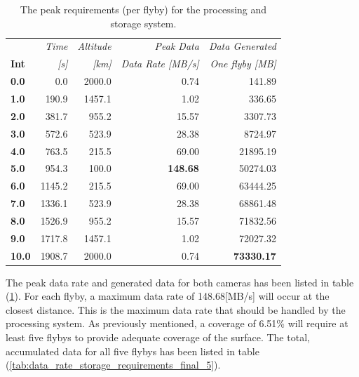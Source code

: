 \begin{table}[htb]
  \centering
    \begin{tabular}{l|r|r|r|r|}
\textbf{} & \textit{Time} & \textit{Altitude} & \textit{Peak Data} & \multicolumn{1}{r}{\textit{Data Generated}} \\
\textbf{Int} & \textit{[s]} & \textit{[km]} & \textit{Data Rate [MB/s]} & \multicolumn{1}{r}{\textit{One flyby [MB]}} \bigstrut[b]\\
\hline
\textbf{0.0} & 0.0   & 2000.0 & 0.74  & 141.89 \bigstrut[t]\\
\textbf{1.0} & 190.9 & 1457.1 & 1.02  & 336.65 \\
\textbf{2.0} & 381.7 & 955.2 & 15.57 & 3307.73 \\
\textbf{3.0} & 572.6 & 523.9 & 28.38 & 8724.97 \\
\textbf{4.0} & 763.5 & 215.5 & 69.00 & 21895.19 \\
\textbf{5.0} & 954.3 & 100.0 & \textbf{148.68} & 50274.03 \\
\textbf{6.0} & 1145.2 & 215.5 & 69.00 & 63444.25 \\
\textbf{7.0} & 1336.1 & 523.9 & 28.38 & 68861.48 \\
\textbf{8.0} & 1526.9 & 955.2 & 15.57 & 71832.56 \\
\textbf{9.0} & 1717.8 & 1457.1 & 1.02  & 72027.32 \\
\textbf{10.0} & 1908.7 & 2000.0 & 0.74  & \textbf{73330.17} \\
\end{tabular}%
        \caption{The peak requirements (per flyby) for the processing and storage system.}
  \label{tab:data_rate_storage_requirements_final}%
\end{table}%
The peak data rate and generated data for both cameras has been listed in table (\ref{tab:data_rate_storage_requirements_final}). For each flyby, a maximum data rate of 148.68[MB/s] will occur at the closest distance. This is the maximum data rate that should be handled by the processing system. 
As previously mentioned, a coverage of 6.51\% will require at least five flybys to provide adequate coverage of the surface. The total, accumulated data for all five flybys has been listed in table (\ref{tab:data_rate_storage_requirements_final_5}).
